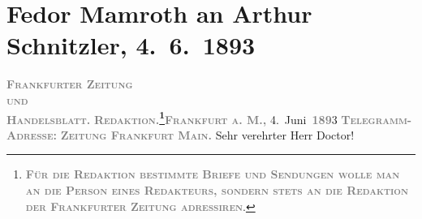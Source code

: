 

         
         \renewcommand{\erwaehntePersonen}{Personen: Fedor Mamroth}
         \renewcommand{\erwaehnteInstitutionen}{Institutionen: Frankfurter Zeitung}
         \renewcommand{\erwaehnteOrte}{Orte: Frankfurt am Main, Wien}
         \renewcommand{\erwaehnteWerke}{Werke: Sterben. Novelle}
               \section[Fedor Mamroth an Arthur Schnitzler, 4. 6. 1893]{ Fedor Mamroth an Arthur Schnitzler, 4. 6. 1893}\nopagebreak{}\rehead{ }\begin{ledgroupsized}[t]{13cm}\normalsize\beginnumbering{} \toendnotes[C]{\smallbreak\pagebreak[2]} 
\toendnotes[C]{\smallbreak}\pstart
           \noindent{}{\pb}\textcolor{gray}{\textbf{\textsc{Frankfurter Zeitung}}}{\\}\textsc{\textcolor{gray}{\textbf{und}}}{\\}\textcolor{gray}{\textbf{\textsc{Handelsblatt.}}}\pend
           \pstart
           \textcolor{gray}{\textbf{\textsc{Redaktion.\footnote{\noindent{}\textcolor{gray}{\textbf{\textsc{Für die Redaktion bestimmte Briefe und
                                       Sendungen wolle man  an die
                                       Person eines Redakteurs, sondern stets \textbf{an die
                                          Redaktion der Frankfurter Zeitung} adressiren}}}.}}}}\hfill \textcolor{gray}{\textbf{\textsc{Frankfurt a. M.,}}}{ }4. Juni \textsc{\textcolor{gray}{\textbf{189}}}3\pend
           \pstart
           \textcolor{gray}{\textbf{\textsc{Telegramm-Adresse:}}}\pend
           \pstart
           \textcolor{gray}{\textbf{\textsc{Zeitung Frankfurt Main.}}}\pend
           \pstart{}Sehr verehrter Herr Doctor!\pend\pstart

\end{ledgroupsized}
